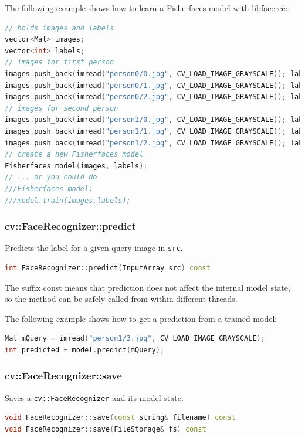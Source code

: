 The following example shows how to learn a Fisherfaces model with libfacerec:
\begin{lstlisting}[language=c++]
// holds images and labels
vector<Mat> images;
vector<int> labels;
// images for first person
images.push_back(imread("person0/0.jpg", CV_LOAD_IMAGE_GRAYSCALE)); labels.push_back(0);
images.push_back(imread("person0/1.jpg", CV_LOAD_IMAGE_GRAYSCALE)); labels.push_back(0);
images.push_back(imread("person0/2.jpg", CV_LOAD_IMAGE_GRAYSCALE)); labels.push_back(0);
// images for second person
images.push_back(imread("person1/0.jpg", CV_LOAD_IMAGE_GRAYSCALE)); labels.push_back(1);
images.push_back(imread("person1/1.jpg", CV_LOAD_IMAGE_GRAYSCALE)); labels.push_back(1);
images.push_back(imread("person1/2.jpg", CV_LOAD_IMAGE_GRAYSCALE)); labels.push_back(1);
// create a new Fisherfaces model
Fisherfaces model(images, labels);
// ... or you could do
///Fisherfaces model;
///model.train(images,labels);
\end{lstlisting}

\subsubsection{cv::FaceRecognizer::predict}

Predicts the label for a given query image in \lstinline|src|.

\begin{lstlisting}[language=c++]
int FaceRecognizer::predict(InputArray src) const
\end{lstlisting}

The suffix const means that prediction does not affect the internal model state, so the method can be safely called from within different threads.

The following example shows how to get a prediction from a trained model:

\begin{lstlisting}[language=c++]
Mat mQuery = imread("person1/3.jpg", CV_LOAD_IMAGE_GRAYSCALE);
int predicted = model.predict(mQuery);
\end{lstlisting}

\subsubsection{cv::FaceRecognizer::save}

Saves a \lstinline|cv::FaceRecognizer| and its model state.

\begin{lstlisting}[language=c++]
void FaceRecognizer::save(const string& filename) const
void FaceRecognizer::save(FileStorage& fs) const
\end{lstlisting}


